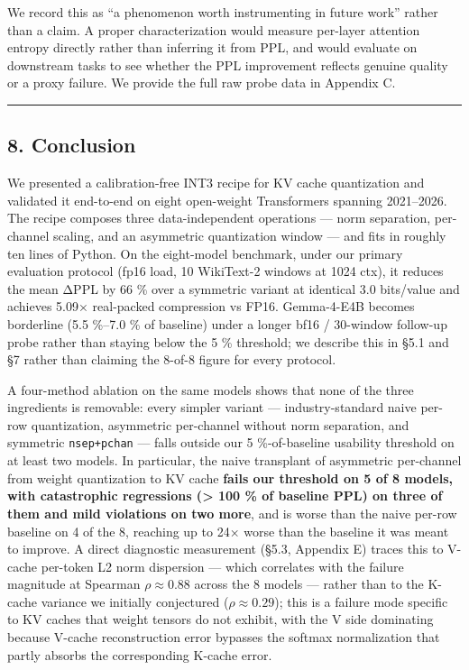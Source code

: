 \documentclass[
]{article}
\newcounter{none} %
\begin{document}
We record this as ``a phenomenon worth instrumenting in future work''
rather than a claim. A proper characterization would measure per-layer
attention entropy directly rather than inferring it from PPL, and would
evaluate on downstream tasks to see whether the PPL improvement reflects
genuine quality or a proxy failure. We provide the full raw probe data
in Appendix C.

\begin{center}\rule{0.5\linewidth}{0.5pt}\end{center}

\subsection{8. Conclusion}\label{conclusion}

We presented a calibration-free INT3 recipe for KV cache quantization
and validated it end-to-end on eight open-weight Transformers spanning
2021--2026. The recipe composes three data-independent operations ---
norm separation, per-channel scaling, and an asymmetric quantization
window --- and fits in roughly ten lines of Python. On the eight-model
benchmark, under our primary evaluation protocol (fp16 load, 10
WikiText-2 windows at 1024 ctx), it reduces the mean ΔPPL by 66 \% over
a symmetric variant at identical 3.0 bits/value and achieves 5.09×
real-packed compression vs FP16. Gemma-4-E4B becomes borderline (5.5
\%--7.0 \% of baseline) under a longer bf16 / 30-window follow-up probe
rather than staying below the 5 \% threshold; we describe this in §5.1
and §7 rather than claiming the 8-of-8 figure for every protocol.

A four-method ablation on the same models shows that none of the three
ingredients is removable: every simpler variant --- industry-standard
naive per-row quantization, asymmetric per-channel without norm
separation, and symmetric \texttt{nsep+pchan} --- falls outside our 5
\%-of-baseline usability threshold on at least two models. In
particular, the naive transplant of asymmetric per-channel from weight
quantization to KV cache \textbf{fails our threshold on 5 of 8 models,
with catastrophic regressions (\textgreater{} 100 \% of baseline PPL) on
three of them and mild violations on two more}, and is worse than the
naive per-row baseline on 4 of the 8, reaching up to 24× worse than the
baseline it was meant to improve. A direct diagnostic measurement (§5.3,
Appendix E) traces this to V-cache per-token L2 norm dispersion ---
which correlates with the failure magnitude at Spearman
\(\rho \approx 0.88\) across the 8 models --- rather than to the K-cache
variance we initially conjectured (\(\rho \approx 0.29\)); this is a
failure mode specific to KV caches that weight tensors do not exhibit,
with the V side dominating because V-cache reconstruction error bypasses
the softmax normalization that partly absorbs the corresponding K-cache
error.
\end{document}
